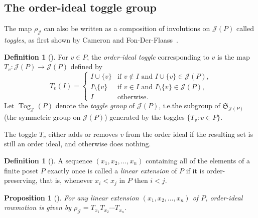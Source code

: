 \documentclass[10pt]{amsart}
\newtheorem{prop}[theo]{Proposition}
\theoremstyle{definition}
\newtheorem{defi}[theo]{Definition}
\newcommand{\ie}{i.e.}
\newcommand{\defn}[1]{\emph{#1}}
\newcommand{\ra}{\rightarrow}
\newcommand{\sm}{\setminus}
\DeclareMathOperator{\tog}{Tog}
\newcommand{\calj}{\mathcal{J}}
\newcommand\rowm{\rho}
\newcommand\rowJ{\rowm_{\mathcal{J}}}
\begin{document}
\subsection{The order-ideal toggle group}
The map $\rowJ$ can also be written as a composition of involutions on $\calj (P)$ called
\emph{toggles}, as first shown by Cameron and Fon-Der-Flaass~\cite{cameronfonder}. 


\begin{defi}[\cite{cameronfonder}]\label{def:comb-row}
For $v\in P$, the \defn{order-ideal toggle} corresponding to $v$ is the map
$T_v: \calj(P)\ra \calj(P)$
defined by
\[
T_v(I)=\begin{cases}
I\cup\{v\} &\text{if $v\not\in I$ and $I\cup\{v\}\in \calj(P)$,}\\
I\sm\{v\} &\text{if $v\in I$ and $I\sm\{v\}\in \calj(P)$,}\\
I &\text{otherwise.}
\end{cases}
\]
Let $\tog_\calj(P)$ denote the \defn{toggle group} of $\calj(P)$, \ie the subgroup of
$\mathfrak{S}_{\calj (P)}$ (the symmetric group on $\calj (P)$) generated by the toggles $\{T_v : v\in P\}$.
\end{defi}

The toggle $T_v$ either adds or removes $v$ from the order ideal if the resulting set is still an order ideal, and otherwise does nothing.

\begin{defi}[{\cite[\S~3.5]{ec1ed2}}]
A sequence $(x_1,x_2,\dots,x_n)$ containing all of the elements of a finite poset $P$ exactly once is called a \defn{linear extension} of $P$ if it is order-preserving, that is, whenever $x_i<x_j$ in $P$ then $i<j$.
\end{defi}

\begin{prop}[\cite{cameronfonder}]\label{prop:row-toggles}
For any linear extension $(x_1,x_2,\dots,x_n)$ of $P$, order-ideal rowmotion is given
by $\rowJ = T_{x_1} T_{x_2} \cdots T_{x_n}$.
\end{prop}
\end{document}
